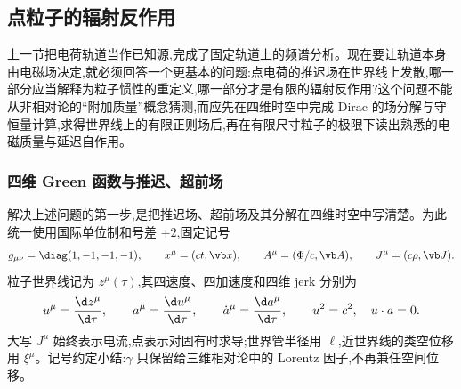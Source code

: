 
\subsection{点粒子的辐射反作用}

上一节把电荷轨道当作已知源,完成了固定轨道上的频谱分析。现在要让轨道本身由电磁场决定,就必须回答一个更基本的问题:点电荷的推迟场在世界线上发散,哪一部分应当解释为粒子惯性的重定义,哪一部分才是有限的辐射反作用?这个问题不能从非相对论的“附加质量”概念猜测,而应先在四维时空中完成 Dirac 的场分解与守恒量计算,求得世界线上的有限正则场后,再在有限尺寸粒子的极限下读出熟悉的电磁质量与延迟自作用。

\subsubsection{四维 Green 函数与推迟、超前场}

解决上述问题的第一步,是把推迟场、超前场及其分解在四维时空中写清楚。为此统一使用国际单位制和号差 $+2$,固定记号
\begin{equation*}
 g_{\mu\nu}=\diag(1,-1,-1,-1),
 \qquad
 x^\mu=(ct,\vb x),
 \qquad
 A^\mu=(\Phi/c,\vb A),
 \qquad
 J^\mu=(c\rho,\vb J).
\end{equation*}
粒子世界线记为 $z^\mu(\tau)$,其四速度、四加速度和四维 jerk 分别为
\begin{equation*}
 u^\mu={\d z^\mu\over\d\tau},
 \qquad
 a^\mu={\d u^\mu\over\d\tau},
 \qquad
 \dot a^\mu={\d a^\mu\over\d\tau},
 \qquad
 u^2=c^2,
 \quad
 u\cdot a=0.
\end{equation*}
大写 $J^\mu$ 始终表示电流,点表示对固有时求导;世界管半径用 $\ell$,近世界线的类空位移用 $\xi^\mu$。记号约定小结:$\gamma$ 只保留给三维相对论中的 Lorentz 因子,不再兼任空间位移。

